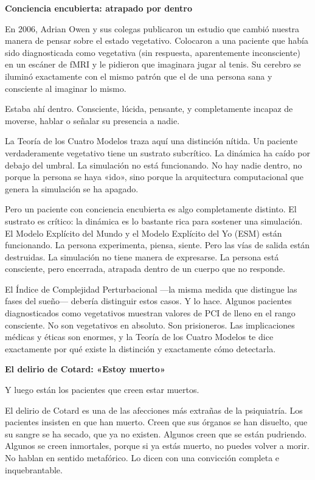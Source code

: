 \documentclass[11pt, twoside, openright]{book}
\begin{document}
\textbf{Conciencia encubierta: atrapado por dentro}

En 2006, Adrian Owen y sus colegas publicaron un estudio que cambió nuestra manera de pensar sobre el estado vegetativo. Colocaron a una paciente que había sido diagnosticada como vegetativa (sin respuesta, aparentemente inconsciente) en un escáner de fMRI y le pidieron que imaginara jugar al tenis. Su cerebro se iluminó exactamente con el mismo patrón que el de una persona sana y consciente al imaginar lo mismo.

Estaba ahí dentro. Consciente, lúcida, pensante, y completamente incapaz de moverse, hablar o señalar su presencia a nadie.

La Teoría de los Cuatro Modelos traza aquí una distinción nítida. Un paciente verdaderamente vegetativo tiene un sustrato subcrítico. La dinámica ha caído por debajo del umbral. La simulación no está funcionando. No hay nadie dentro, no porque la persona se haya «ido», sino porque la arquitectura computacional que genera la simulación se ha apagado.

Pero un paciente con conciencia encubierta es algo completamente distinto. El sustrato es crítico: la dinámica es lo bastante rica para sostener una simulación. El Modelo Explícito del Mundo y el Modelo Explícito del Yo (ESM) están funcionando. La persona experimenta, piensa, siente. Pero las vías de salida están destruidas. La simulación no tiene manera de expresarse. La persona está consciente, pero encerrada, atrapada dentro de un cuerpo que no responde.

El Índice de Complejidad Perturbacional ---la misma medida que distingue las fases del sueño--- debería distinguir estos casos. Y lo hace. Algunos pacientes diagnosticados como vegetativos muestran valores de PCI de lleno en el rango consciente. No son vegetativos en absoluto. Son prisioneros. Las implicaciones médicas y éticas son enormes, y la Teoría de los Cuatro Modelos te dice exactamente por qué existe la distinción y exactamente cómo detectarla.

\textbf{El delirio de Cotard: «Estoy muerto»}

Y luego están los pacientes que creen estar muertos.

El delirio de Cotard es una de las afecciones más extrañas de la psiquiatría. Los pacientes insisten en que han muerto. Creen que sus órganos se han disuelto, que su sangre se ha secado, que ya no existen. Algunos creen que se están pudriendo. Algunos se creen inmortales, porque si ya estás muerto, no puedes volver a morir. No hablan en sentido metafórico. Lo dicen con una convicción completa e inquebrantable.
\end{document}
